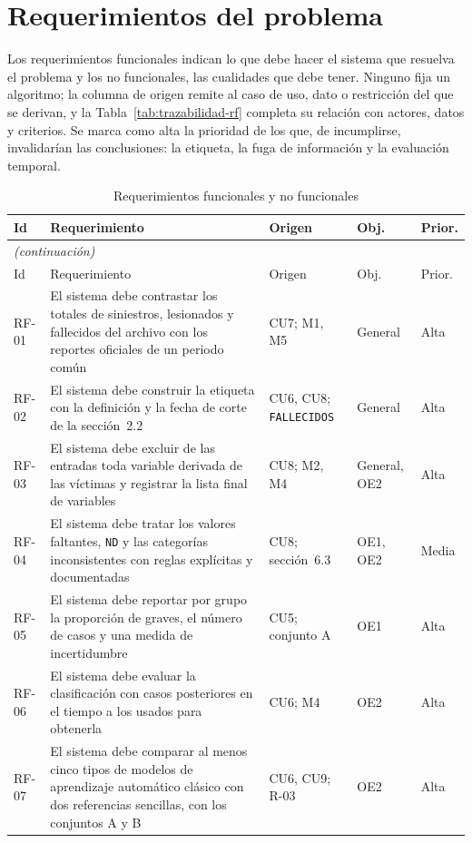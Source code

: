\section{Requerimientos del problema}

Los requerimientos funcionales indican lo que debe hacer el sistema que resuelva el problema y los no funcionales, las cualidades que debe tener. Ninguno fija un algoritmo; la columna de origen remite al caso de uso, dato o restricción del que se derivan, y la Tabla~\ref{tab:trazabilidad-rf} completa su relación con actores, datos y criterios. Se marca como alta la prioridad de los que, de incumplirse, invalidarían las conclusiones: la etiqueta, la fuga de información y la evaluación temporal.

\begin{longtable}{p{1.2cm}p{7.0cm}p{2.4cm}p{1.6cm}p{1.2cm}}
\caption{Requerimientos funcionales y no funcionales}
\label{tab:requerimientos}\\
\toprule
Id & Requerimiento & Origen & Obj. & Prior. \\
\midrule
\endfirsthead
\multicolumn{5}{l}{\footnotesize\itshape (continuación)}\\
\toprule
Id & Requerimiento & Origen & Obj. & Prior. \\
\midrule
\endhead
\bottomrule
\endfoot
RF-01 & El sistema debe contrastar los totales de siniestros, lesionados y fallecidos del archivo con los reportes oficiales de un periodo común & CU7; M1, M5 & General & Alta \\
RF-02 & El sistema debe construir la etiqueta con la definición y la fecha de corte de la sección~2.2 & CU6, CU8; \texttt{FALLECIDOS} & General & Alta \\
RF-03 & El sistema debe excluir de las entradas toda variable derivada de las víctimas y registrar la lista final de variables & CU8; M2, M4 & General, OE2 & Alta \\
RF-04 & El sistema debe tratar los valores faltantes, \texttt{ND} y las categorías inconsistentes con reglas explícitas y documentadas & CU8; sección~6.3 & OE1, OE2 & Media \\
RF-05 & El sistema debe reportar por grupo la proporción de graves, el número de casos y una medida de incertidumbre & CU5; conjunto A & OE1 & Alta \\
RF-06 & El sistema debe evaluar la clasificación con casos posteriores en el tiempo a los usados para obtenerla & CU6; M4 & OE2 & Alta \\
RF-07 & El sistema debe comparar al menos cinco tipos de modelos de aprendizaje automático clásico con dos referencias sencillas, con los conjuntos A y B & CU6, CU9; R-03 & OE2 & Alta \\

\end{longtable}
